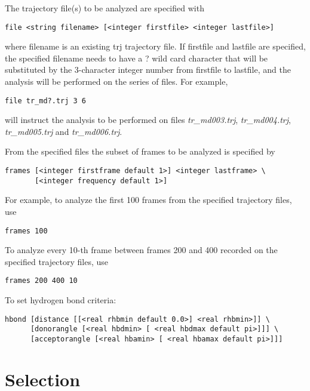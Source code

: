 The trajectory file(s) to be analyzed are specified with

\begin{verbatim}
file <string filename> [<integer firstfile> <integer lastfile>] 
\end{verbatim}

where {\rm filename} is an existing {\rm trj} trajectory file.
If {\rm firstfile} and {\rm lastfile} are specified, the specified
{\rm filename} needs to have a {\rm ?} wild card character that will 
be substituted by the 3-character integer number from {\rm firstfile} 
to {\rm lastfile}, and the analysis will be performed on the series 
of files.
For example,

\begin{verbatim}
file tr_md?.trj 3 6
\end{verbatim}

will instruct the analysis to be performed on files {\it tr\_md003.trj},
{\it tr\_md004.trj}, {\it tr\_md005.trj} and {\it tr\_md006.trj}.

\par
From the specified files the subset of frames to be analyzed is 
specified by

\begin{verbatim}
frames [<integer firstframe default 1>] <integer lastframe> \
       [<integer frequency default 1>]
\end{verbatim}

For example, to analyze the first 100 frames from the specified
trajectory files, use

\begin{verbatim}
frames 100
\end{verbatim}

To analyze every 10-th frame between frames 200 and 400 recorded on
the specified trajectory files, use

\begin{verbatim}
frames 200 400 10
\end{verbatim}

To set hydrogen bond criteria:

\begin{verbatim}
hbond [distance [[<real rhbmin default 0.0>] <real rhbmin>]] \
      [donorangle [<real hbdmin> [ <real hbdmax default pi>]]] \
      [acceptorangle [<real hbamin> [ <real hbamax default pi>]]]
\end{verbatim}

\section{Selection}

